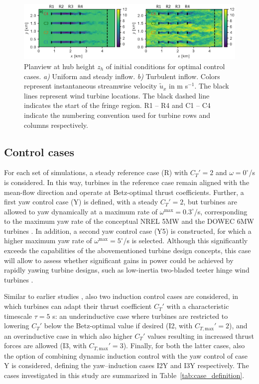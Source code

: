 \documentclass[energies,article,submit,moreauthors,latex,10pt,a4paper]{mdpi}
\newcommand{\ctmax}{C_{T,\text{max}}'}
\begin{document}
\begin{figure}
	\includegraphics[width=\textwidth]{figure3}
	\caption{Planview at hub height $z_h$ of initial conditions for optimal control cases. \emph{a)} Uniform and steady inflow. \emph{b)} Turbulent inflow. Colors represent instantaneous streamwise velocity $\widetilde{u}_x$ in m s$^{-1}$. The black lines represent wind turbine locations. The black dashed line indicates the start of the fringe region. R1 -- R4 and C1 -- C4 indicate the numbering convention used for turbine rows and columns respectively. \label{fig:initial_conditions_flow_yaw}}
\end{figure}

\subsection{Control cases}\label{sec:case_definition}

\noindent For each set of simulations, a steady reference case (R) with $C_T' = 2$ and $\omega = 0^\circ$/s is considered. In this way, turbines in the reference case remain aligned with the mean-flow direction and operate at Betz-optimal thrust coefficients. Further, a first yaw control case (Y) is defined, with a steady $C_T'=2$, but turbines are allowed to yaw dynamically at a maximum rate of $\omega^{\text{max}} = 0.3^\circ$/s, corresponding to the maximum yaw rate of the conceptual NREL 5MW and the DOWEC 6MW turbines \cite{jonkman2009definition, kooijman2003dowec}. In addition, a second yaw control case (Y5) is constructed, for which a higher maximum yaw rate of $\omega^{\text{max}} = 5^\circ$/s is selected. Although this significantly exceeds the capabilities of the abovementioned turbine design concepts, this case will allow to assess whether significant gains in power could be achieved by rapidly yawing turbine designs, such as low-inertia two-bladed teeter hinge wind turbines \cite{kim2014yaw}. 

Similar to earlier studies \cite{munters2016turbulent, munters2016effect}, also two induction control cases are considered, in which turbines can adapt their thrust coefficient $C_T'$ with a characteristic timescale $\tau = 5$ s: an underinductive case where turbines are restricted to lowering $C_T'$ below the Betz-optimal value if desired (I2, with $\ctmax = 2$), and an overinductive case in which also higher $C_T'$ values resulting in increased thrust forces are allowed (I3, with $\ctmax = 3$). Finally, for both the latter cases, also the option of combining dynamic induction control with the yaw control of case Y is considered, defining the yaw--induction cases I2Y and I3Y respectively. The cases investigated in this study are summarized in Table~\ref{tab:case_definition}. 
\end{document}
